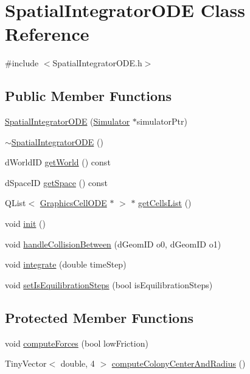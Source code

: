 \hypertarget{class_spatial_integrator_o_d_e}{\section{\-Spatial\-Integrator\-O\-D\-E \-Class \-Reference}
\label{class_spatial_integrator_o_d_e}
}


{\ttfamily \#include $<$\-Spatial\-Integrator\-O\-D\-E.\-h$>$}

\subsection*{\-Public \-Member \-Functions}
\begin{DoxyCompactItemize}
\item 
\hyperlink{class_spatial_integrator_o_d_e_acbf19be7f7e57f3f4e7d40821c403435}{\-Spatial\-Integrator\-O\-D\-E} (\hyperlink{class_simulator}{\-Simulator} $\ast$simulator\-Ptr)
\item 
\hyperlink{class_spatial_integrator_o_d_e_aea72c2ef2450a678d8914cd9e826ebc2}{$\sim$\-Spatial\-Integrator\-O\-D\-E} ()
\item 
d\-World\-I\-D \hyperlink{class_spatial_integrator_o_d_e_a5aabe38f475e883e1ddce57a4fdd7bd9}{get\-World} () const 
\item 
d\-Space\-I\-D \hyperlink{class_spatial_integrator_o_d_e_a3be9bcc6f8b61ead5db72ce5f565195a}{get\-Space} () const 
\item 
\-Q\-List$<$ \hyperlink{class_graphics_cell_o_d_e}{\-Graphics\-Cell\-O\-D\-E} $\ast$ $>$ $\ast$ \hyperlink{class_spatial_integrator_o_d_e_a5acba09a24653a4a249552b2cefb9f9e}{get\-Cells\-List} ()
\item 
void \hyperlink{class_spatial_integrator_o_d_e_acdbf47a8d5e9fd7b9eba7c41fbda3abf}{init} ()
\item 
void \hyperlink{class_spatial_integrator_o_d_e_a09aca010b723441070e2d07e09f15bd5}{handle\-Collision\-Between} (d\-Geom\-I\-D o0, d\-Geom\-I\-D o1)
\item 
void \hyperlink{class_spatial_integrator_o_d_e_a719fbe66b4cdb1271e7ca807697613f9}{integrate} (double time\-Step)
\item 
void \hyperlink{class_spatial_integrator_o_d_e_a32b1a80ee42f27acbd58806ca165f026}{set\-Is\-Equilibration\-Steps} (bool is\-Equilibration\-Steps)
\end{DoxyCompactItemize}
\subsection*{\-Protected \-Member \-Functions}
\begin{DoxyCompactItemize}
\item 
void \hyperlink{class_spatial_integrator_o_d_e_aed66f4007ba5dceaa492f74e60557ca8}{compute\-Forces} (bool low\-Friction)
\item 
\-Tiny\-Vector$<$ double, 4 $>$ \hyperlink{class_spatial_integrator_o_d_e_ae14b3a94369557bf92768aab7452f8f6}{compute\-Colony\-Center\-And\-Radius} ()
\end{DoxyCompactItemize}
